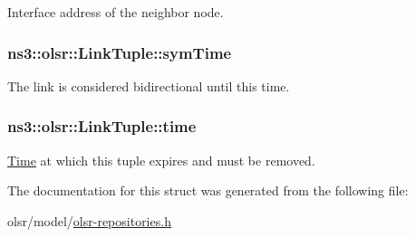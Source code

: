 Interface address of the neighbor node. 

\subsubsection[{\texorpdfstring{sym\+Time}{symTime}}]{ ns3\+::olsr\+::\+Link\+Tuple\+::sym\+Time}\hypertarget{structns3_1_1olsr_1_1LinkTuple_ae436ab46606d9bc58e9304a53a6e3d0a}{}\label{structns3_1_1olsr_1_1LinkTuple_ae436ab46606d9bc58e9304a53a6e3d0a}


The link is considered bidirectional until this time. 

\subsubsection[{\texorpdfstring{time}{time}}]{ ns3\+::olsr\+::\+Link\+Tuple\+::time}\hypertarget{structns3_1_1olsr_1_1LinkTuple_a240c13ecdb4b42f3aedaf66184b9328e}{}\label{structns3_1_1olsr_1_1LinkTuple_a240c13ecdb4b42f3aedaf66184b9328e}


\hyperlink{classns3_1_1Time}{Time} at which this tuple expires and must be removed. 



The documentation for this struct was generated from the following file\+:\begin{DoxyCompactItemize}
\item 
olsr/model/\hyperlink{olsr-repositories_8h}{olsr-\/repositories.\+h}\end{DoxyCompactItemize}

